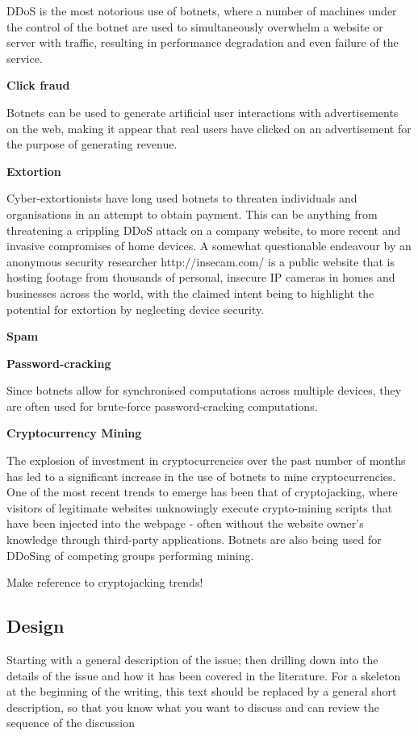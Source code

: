 DDoS is the most notorious use of botnets, where a number of machines under the control of the botnet are used to simultaneously overwhelm a website or server with traffic, resulting in performance degradation and even failure of the service.

\bullet \textbf{Click fraud}

Botnets can be used to generate artificial user interactions with advertisements on the web, making it appear that real users have clicked on an advertisement for the purpose of generating revenue.

\bullet \textbf{Extortion}

Cyber-extortionists have long used botnets to threaten individuals and organisations in an attempt to obtain payment. This can be anything from threatening a crippling DDoS attack on a company website, to more recent and invasive compromises of home devices. A somewhat questionable endeavour by an anonymous security researcher {http://insecam.com/} is a public website that is hosting footage from thousands of personal, insecure IP cameras in homes and businesses across the world, with the claimed intent being to highlight the potential for extortion by neglecting device security.

\bullet \textbf{Spam}

\bullet \textbf{Password-cracking}

Since botnets allow for synchronised computations across multiple devices, they are often used for brute-force password-cracking computations.

\bullet \textbf{Cryptocurrency Mining}

The explosion of investment in cryptocurrencies over the past number of months has led to a significant increase in the use of botnets to mine cryptocurrencies. One of the most recent trends to emerge has been that of cryptojacking, where visitors of legitimate websites unknowingly execute crypto-mining scripts that have been injected into the webpage - often without the website owner's knowledge through third-party applications. Botnets are also being used for DDoSing of competing groups performing mining.

Make reference to cryptojacking trends!

\subsection{Design}

Starting with a general description of the issue; then drilling down into the details of the issue and how it has been covered in the literature. For a skeleton at the beginning of the writing, this text should be replaced by a general short description, so that you know what you want to discuss and can review the sequence of the discussion

